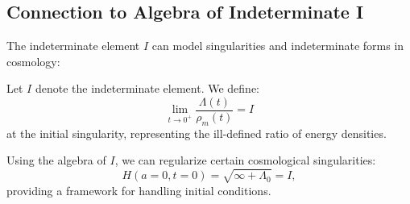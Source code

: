 \subsection{Connection to Algebra of Indeterminate I}

The indeterminate element $I$ can model singularities and indeterminate forms in cosmology:

\begin{definition}
Let $I$ denote the indeterminate element. We define:
\[
\lim_{t \to 0^+} \frac{\Lambda(t)}{\rho_m(t)} = I
\]
at the initial singularity, representing the ill-defined ratio of energy densities.
\end{definition}

\begin{proposition}
Using the algebra of $I$, we can regularize certain cosmological singularities:
\[
H(a=0, t=0) = \sqrt{\infty + \Lambda_0} = I,
\]
providing a framework for handling initial conditions.
\end{proposition}
